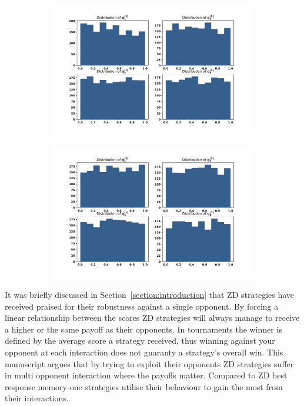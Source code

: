 \documentclass[10pt]{article}
\begin{document}
\begin{figure}[!htbp]
    \begin{subfigure}{0.49\textwidth}
        \centering
        \includegraphics[width=\linewidth]{img/first_opponent_probabilities.pdf}
        \label{fig:first_opponents_probabilities}
    \end{subfigure}
    \begin{subfigure}{0.49\textwidth}
        \centering
        \includegraphics[width=\linewidth]{img/second_opponent_probabilities.pdf}
        \label{fig:second_opponents_probabilities}
    \end{subfigure}
\end{figure}

It was briefly discussed in Section~\ref{section:introduction} that ZD strategies
have received praised for their robustness against a single opponent. By forcing
a linear relationship between the scores ZD strategies will always manage to
receive a higher or the same payoff as their opponents. In tournaments the winner
is defined by the average score a strategy received, thus winning against your
opponent at each interaction does not guaranty a strategy's overall win.
This manuscript argues that by trying to exploit their opponents ZD strategies suffer in
multi opponent interaction where the payoffs matter. Compared to ZD best response
memory-one strategies utilise their behaviour to gain the most from their interactions.
\end{document}
